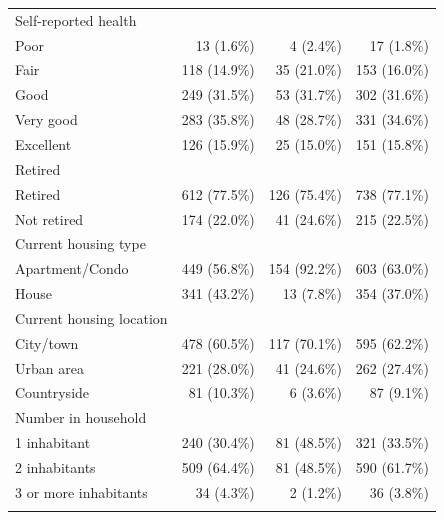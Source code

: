 \begin{table}[H]
\begin{threeparttable}
\begin{tabular}[t]{lrrr}
Self-reported health & & & \\
\hspace{1em}Poor & 13 (1.6\%) & 4 (2.4\%) & 17 (1.8\%) \\
\hspace{1em}Fair & 118 (14.9\%) & 35 (21.0\%) & 153 (16.0\%) \\
\hspace{1em}Good & 249 (31.5\%) & 53 (31.7\%) & 302 (31.6\%) \\
\hspace{1em}Very  good & 283 (35.8\%) & 48 (28.7\%) & 331 (34.6\%) \\
\hspace{1em}Excellent & 126 (15.9\%) & 25 (15.0\%) & 151 (15.8\%) \\
\addlinespace[0.6em]

Retired & & & \\
\hspace{1em}Retired & 612 (77.5\%) & 126 (75.4\%) & 738 (77.1\%) \\
\hspace{1em}Not retired & 174 (22.0\%) & 41 (24.6\%) & 215 (22.5\%) \\
\addlinespace[0.6em]

Current housing type & & & \\
\hspace{1em}Apartment/Condo & 449 (56.8\%) & 154 (92.2\%) & 603 (63.0\%) \\
\hspace{1em}House & 341 (43.2\%) & 13 (7.8\%) & 354 (37.0\%) \\
\addlinespace[0.6em]

Current housing location & & & \\
\hspace{1em}City/town & 478 (60.5\%) & 117 (70.1\%) & 595 (62.2\%) \\
\hspace{1em}Urban area & 221 (28.0\%) & 41 (24.6\%) & 262 (27.4\%) \\
\hspace{1em}Countryside & 81 (10.3\%) & 6 (3.6\%) & 87 (9.1\%) \\
\addlinespace[0.6em]

Number in household & & & \\
\hspace{1em}1 inhabitant& 240 (30.4\%) & 81 (48.5\%) & 321 (33.5\%) \\
\hspace{1em}2 inhabitants & 509 (64.4\%) & 81 (48.5\%) & 590 (61.7\%) \\
\hspace{1em}3 or more inhabitants& 34 (4.3\%) & 2 (1.2\%) & 36 (3.8\%) \\
\addlinespace[0.6em]


\end{tabular}
\end{threeparttable}
\end{table}
